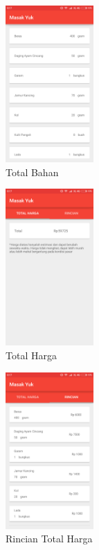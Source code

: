 		\begin{figure}[H]
			\centering
			\includegraphics[width=0.3\textwidth]{gambar/mock-up/total_bahan}
			\caption{Total Bahan}
		\end{figure}	
		\begin{figure}[H]
			\centering
			\includegraphics[width=0.3\textwidth]{gambar/mock-up/total_harga}
			\caption{Total Harga}
		\end{figure}	
		\begin{figure}[H]
			\centering
			\includegraphics[width=0.3\textwidth]{gambar/mock-up/total_list_harga}
			\caption{Rincian Total Harga}
		\end{figure}	
